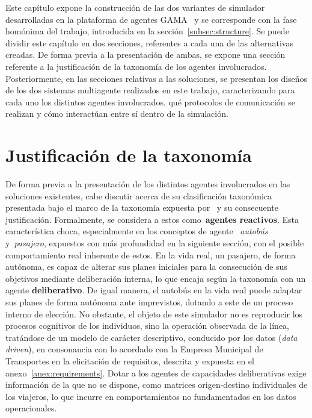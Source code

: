 Este capítulo expone la construcción de las dos variantes de simulador desarrolladas en la plataforma de agentes 
GAMA~\cite{taillandier2019gama} y se corresponde con la fase homónima del trabajo, introducida en la 
sección~\ref{subsec:structure}. Se puede dividir este capítulo en dos secciones, referentes a cada una de las alternativas
creadas. De forma previa a la presentación de ambas, se expone una sección referente a la justificación de la taxonomía de los agentes
involucrados. Posteriormente, en las secciones relativas a las soluciones, se presentan los diseños de los dos
sistemas multiagente realizados en este trabajo, caracterizando para cada uno los distintos agentes involucrados, qué protocolos 
de comunicación se realizan y cómo interactúan entre sí dentro de la simulación.

\section{Justificación de la taxonomía}
De forma previa a la presentación de los distintos agentes involucrados en las soluciones existentes,
 cabe discutir acerca de su clasificación taxonómica 
presentada bajo el marco de la taxonomía expuesta por~\textcite{Wooldridge1995} y su consecuente justificación. Formalmente, 
se considera a estos como~\textbf{agentes reactivos}. Esta característica choca, especialmente en los conceptos de agente
~\textit{autobús} y~\textit{pasajero}, expuestos con más profundidad en la siguiente sección, con el posible comportamiento real 
inherente de estos. En la vida real, un pasajero, de forma autónoma, es capaz
de alterar sus planes iniciales para la consecución de sus objetivos mediante deliberación interna, lo que encaja según la 
taxonomía con un agente \textbf{deliberativo}. De igual manera, el autobús en la vida real puede adaptar sus planes de forma autónoma
ante imprevistos, dotando a este de un proceso interno de elección. No obstante, el objeto de este
simulador no es reproducir los procesos cognitivos de los individuos, sino la operación observada de la línea, tratándose de 
un modelo de carácter descriptivo, conducido por los datos (\textit{data driven}), en consonancia con lo acordado
con la Empresa Municipal de Transportes en la elicitación de requisitos, descrita y expuesta en el anexo~\ref{anex:requirements}. 
Dotar a los agentes de capacidades deliberativas exige información de la que no se dispone, como matrices origen-destino 
individuales de los viajeros, lo que incurre en comportamientos no fundamentados en los datos operacionales.

